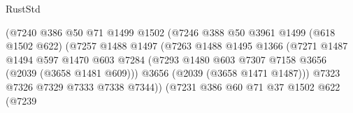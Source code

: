 \begin{lexlean}{RustStd}
\begin{coremodule}
                                        (@7240
                                          @386
                                          @50
                                          @71
                                          @1499
                                          @1502
                                          (@7246
                                            @388
                                            @50
                                            @3961
                                            @1499
                                            (@618 @1502 @622)
                                            (@7257
                                              @1488
                                              @1497
                                              (@7263
                                                @1488
                                                @1495
                                                @1366
                                                (@7271
                                                  @1487
                                                  @1494
                                                  @597
                                                  @1470
                                                  @603
                                                  @7284
                                                  (@7293
                                                    @1480
                                                    @603
                                                    @7307
                                                    @7158
                                                    @3656
                                                    (@2039 (@3658 @1481 @609)))
                                                  @3656
                                                  (@2039 (@3658 @1471 @1487)))
                                                @7323
                                                @7326
                                                @7329
                                                @7333
                                                @7338
                                                @7344))
                                            (@7231
                                              @386
                                              @60
                                              @71
                                              @37
                                              @1502
                                              @622
                                              (@7239

\end{coremodule}
\end{lexlean}
